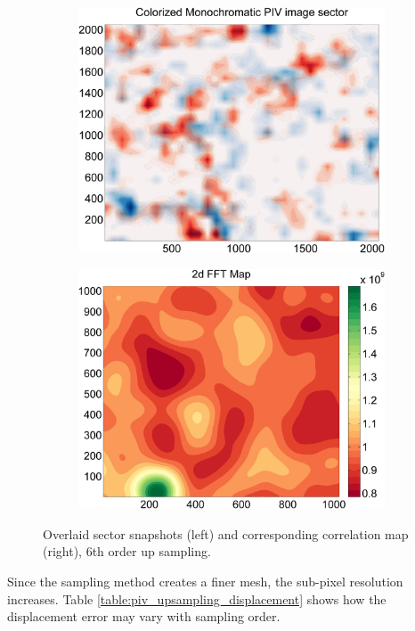 \begin{figure}[H]
	\begin{subfigure}{.49\textwidth}
		\centering
		\includegraphics[width=.9\linewidth]{figs/piv_method/pive-fig_order6}
	\end{subfigure} 
	\begin{subfigure}{.49\textwidth}
		\centering
		\includegraphics[width=.9\linewidth]{figs/piv_method/pive_fft_order6}
	\end{subfigure}	
	\caption{Overlaid sector snapshots (left) and corresponding correlation 
		map (right), 6th order up sampling.}
	\label{fig:piv_sector_overlay_fft_6up}
\end{figure}

Since the sampling method creates a finer mesh, the sub-pixel resolution 
increases. Table \ref{table:piv_upsampling_displacement} shows how the 
displacement error may vary with sampling order.

